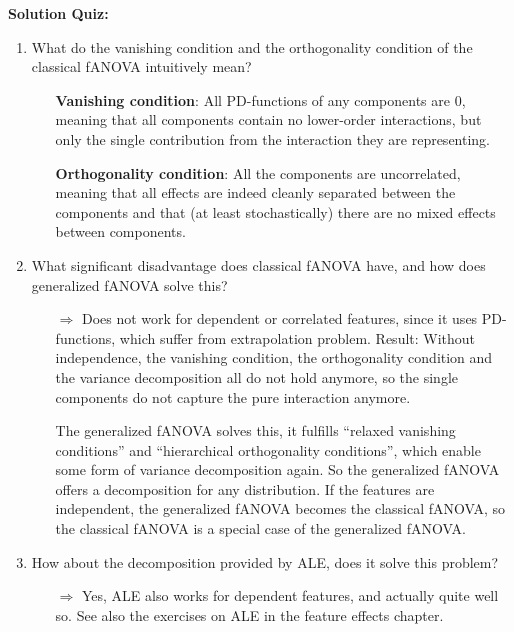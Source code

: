 \textbf{Solution Quiz:}\\\noindent
\medskip

\begin{enumerate}
    
    \item 
    What do the vanishing condition and the orthogonality condition of the classical fANOVA intuitively mean?
    
    \begin{itemize}
    
        \item[\textbf{Vanishing condition}:] All PD-functions of any components are 0, meaning that all components contain no lower-order interactions, but only the single contribution from the interaction they are representing.
    
        \item[\textbf{Orthogonality condition}:] All the components are uncorrelated, meaning that all effects are indeed cleanly separated between the components and that (at least stochastically) there are no mixed effects between components.
    
    \end{itemize}
    
    \item
    What significant disadvantage does classical fANOVA have, and how does generalized fANOVA solve this?
    \begin{itemize}
        \item[$\Rightarrow$]
        Does not work for dependent or correlated features, since it uses PD-functions, which suffer from extrapolation problem.
        Result: Without independence, the vanishing condition, the orthogonality condition and the variance decomposition all do not hold anymore, so the single components do not capture the pure interaction anymore.
        
        The generalized fANOVA solves this, it fulfills ``relaxed vanishing conditions'' and ``hierarchical orthogonality conditions'', which enable some form of variance decomposition again.
        So the generalized fANOVA offers a decomposition for any distribution.
        If the features are independent, the generalized fANOVA becomes the classical fANOVA, so the classical fANOVA is a special case of the generalized fANOVA.
    \end{itemize}
    
    \item
    How about the decomposition provided by ALE, does it solve this problem?
    \begin{itemize}
        \item[$\Rightarrow$]
        Yes, ALE also works for dependent features, and actually quite well so.
        See also the exercises on ALE in the feature effects chapter.
    \end{itemize}
    

\end{enumerate}

